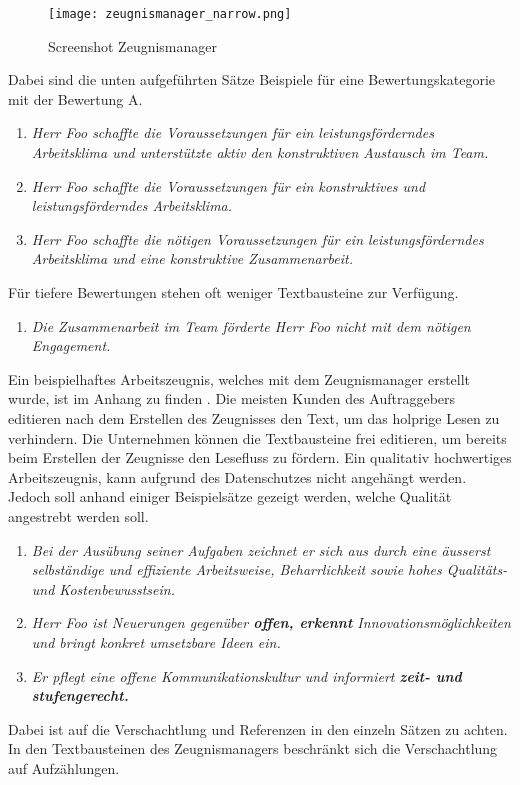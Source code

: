 \begin{figure}[H]
	\centering
	\texttt{[image: zeugnismanager\_narrow.png]}
	\caption{Screenshot Zeugnismanager}
	\label{fig:screenshot_zeugnismanager}
\end{figure}
\noindent
\newline
Dabei sind die unten aufgeführten Sätze Beispiele für eine Bewertungskategorie mit der Bewertung A.
\begin{enumerate}
	\setlength\itemsep{0em}
	\item \textit{Herr Foo schaffte die Voraussetzungen für ein leistungsförderndes Arbeitsklima und unterstützte aktiv den konstruktiven Austausch im Team.}
	\item \textit{Herr Foo schaffte die Voraussetzungen für ein konstruktives und leistungsförderndes Arbeitsklima.}
	\item \textit{Herr Foo schaffte die nötigen Voraussetzungen für ein leistungsförderndes Arbeitsklima und eine konstruktive Zusammenarbeit.}
\end{enumerate}

Für tiefere Bewertungen stehen oft weniger Textbausteine zur Verfügung.
\begin{enumerate}
	\setlength\itemsep{0em}
	\item \textit{Die Zusammenarbeit im Team förderte Herr Foo nicht mit dem nötigen Engagement.}
\end{enumerate}
\noindent
Ein beispielhaftes Arbeitszeugnis, welches mit dem Zeugnismanager erstellt wurde, ist im Anhang zu finden
. Die meisten Kunden des Auftraggebers editieren nach dem Erstellen des Zeugnisses
den Text, um das holprige Lesen zu verhindern. Die Unternehmen können die Textbausteine frei editieren, um bereits beim
Erstellen der Zeugnisse den Lesefluss zu fördern. Ein qualitativ hochwertiges Arbeitszeugnis, kann aufgrund des
Datenschutzes nicht angehängt werden. Jedoch soll anhand einiger Beispielsätze gezeigt werden, welche Qualität
angestrebt werden soll.
\begin{enumerate}
	\setlength\itemsep{0em}
	\item \textit{Bei der Ausübung seiner Aufgaben zeichnet er sich aus durch eine äusserst selbständige und effiziente Arbeitsweise, Beharrlichkeit sowie hohes Qualitäts- und Kostenbewusstsein.}
	\item \textit{Herr Foo ist Neuerungen gegenüber \textbf{offen, erkennt} Innovationsmöglichkeiten und bringt konkret umsetzbare Ideen ein.}
	\item \textit{Er pflegt eine offene Kommunikationskultur und informiert \textbf{zeit- und stufengerecht.}}
\end{enumerate}
\noindent
Dabei ist auf die Verschachtlung und Referenzen in den einzeln Sätzen zu achten. In den Textbausteinen des
Zeugnismanagers beschränkt sich die Verschachtlung auf Aufzählungen.

